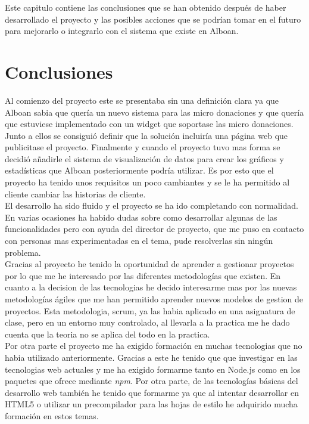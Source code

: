 Este capitulo contiene las conclusiones que se han obtenido después de haber desarrollado el proyecto y las posibles acciones que se podrían tomar en el futuro para mejorarlo o integrarlo con el sistema que existe en Alboan.

\section{Conclusiones}
Al comienzo del proyecto este se presentaba sin una definición clara ya que Alboan sabia que quería un nuevo sistema para las micro donaciones y que quería que estuviese implementado con un widget que soportase las micro donaciones. Junto a ellos se consiguió definir que la solución incluiría una página web que publicitase el proyecto. Finalmente y cuando el proyecto tuvo mas forma se decidió añadirle el sistema de visualización de datos para crear los gráficos y estadísticas que Alboan posteriormente podría utilizar. Es por esto que el proyecto ha tenido unos requisitos un poco cambiantes y se le ha permitido al cliente cambiar las historias de cliente.\\

El desarrollo ha sido fluido y el proyecto se ha ido completando con normalidad. En varias ocasiones ha habido dudas sobre como desarrollar algunas de las funcionalidades pero con ayuda del director de proyecto, que me puso en contacto con personas mas experimentadas en el tema, pude resolverlas sin ningún problema.\\

Gracias al proyecto he tenido la oportunidad de aprender a gestionar proyectos por lo que me he interesado por las diferentes metodologías que existen. En cuanto a la decision de las tecnologias he decido interesarme mas por las nuevas metodologías ágiles que me han permitido aprender nuevos modelos de gestion de proyectos. Esta metodologia, scrum, ya las habia aplicado en una asignatura de clase, pero en un entorno muy controlado, al llevarla a la practica me he dado cuenta que la teoria no se aplica del todo en la practica.\\

Por otra parte el proyecto me ha exigido formación en muchas tecnologias que no habia utilizado anteriormente. Gracias a este he tenido que que investigar en las tecnologias web actuales y me ha exigido formarme tanto en Node.js como en los paquetes que ofrece mediante \textit{npm}. Por otra parte, de las tecnologías básicas del desarrollo web también he tenido que formarme ya que al intentar desarrollar en HTML5 o utilizar un precompilador para las hojas de estilo he adquirido mucha formación en estos temas.\\

